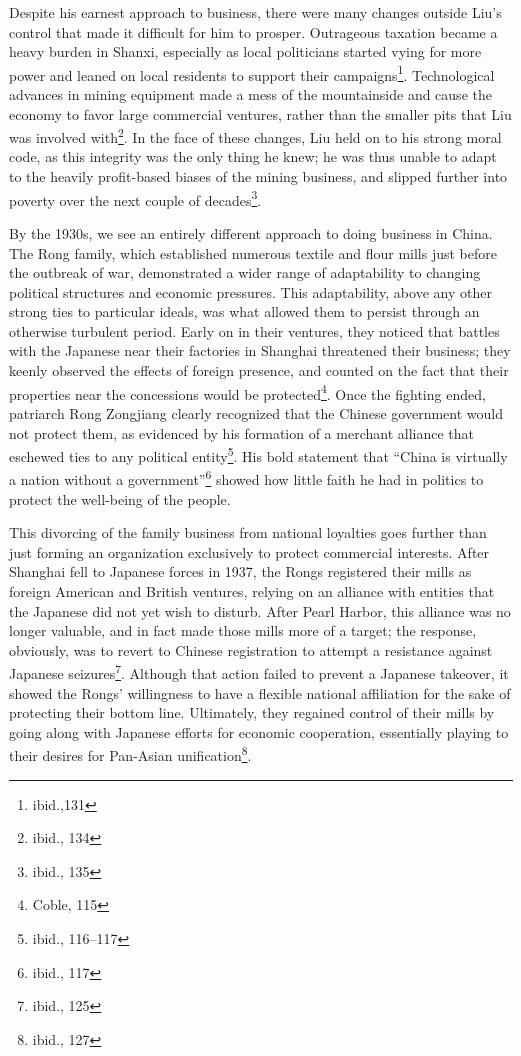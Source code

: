 Despite his earnest approach to business, there were many changes outside Liu's
control that made it difficult for him to prosper. Outrageous taxation became a
heavy burden in Shanxi, especially as local politicians started vying for more
power and leaned on local residents to support their
campaigns\footnote{ibid.,131}.  Technological advances in mining equipment made
a mess of the mountainside and cause the economy to favor large commercial
ventures, rather than the smaller pits that Liu was involved
with\footnote{ibid., 134}. In the face of these changes, Liu held on to his
strong moral code, as this integrity was the only thing he knew; he was thus
unable to adapt to the heavily profit-based biases of the mining business, and
slipped further into poverty over the next couple of decades\footnote{ibid.,
135}.

By the 1930s, we see an entirely different approach to doing business in China.
The Rong family, which established numerous textile and flour mills just before
the outbreak of war, demonstrated a wider range of adaptability to changing
political structures and economic pressures. This adaptability, above any other
strong ties to particular ideals, was what allowed them to persist through an
otherwise turbulent period. Early on in their ventures, they noticed that
battles with the Japanese near their factories in Shanghai threatened their
business; they keenly observed the effects of foreign presence, and counted on
the fact that their properties near the concessions would be
protected\footnote{Coble, 115}. Once the fighting ended, patriarch Rong
Zongjiang clearly recognized that the Chinese government would not protect them,
as evidenced by his formation of a merchant alliance that eschewed ties to any
political entity\footnote{ibid., 116--117}. His bold statement that ``China is
virtually a nation without a government''\footnote{ibid., 117} showed how little
faith he had in politics to protect the well-being of the people.

This divorcing of the family business from national loyalties goes further than
just forming an organization exclusively to protect commercial interests. After
Shanghai fell to Japanese forces in 1937, the Rongs registered their mills as
foreign American and British ventures, relying on an alliance with entities that
the Japanese did not yet wish to disturb. After Pearl Harbor, this alliance was
no longer valuable, and in fact made those mills more of a target; the response,
obviously, was to revert to Chinese registration to attempt a resistance against
Japanese seizures\footnote{ibid., 125}. Although that action failed to prevent a
Japanese takeover, it showed the Rongs' willingness to have a flexible national
affiliation for the sake of protecting their bottom line. Ultimately, they
regained control of their mills by going along with Japanese efforts for
economic cooperation, essentially playing to their desires for Pan-Asian
unification\footnote{ibid., 127}.

